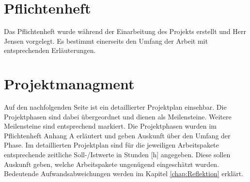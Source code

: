 
\appendix

\chapter{Pflichtenheft}
\label{Pflichtenheft}

Das Pflichtenheft wurde während der Einarbeitung des Projekts erstellt und Herr Jensen vorgelegt. Es bestimmt einerseits den Umfang der Arbeit mit entsprechenden Erläuterungen.




\chapter{Projektmanagment}
\label{Projektmanagment}

Auf den nachfolgenden Seite ist ein detaillierter Projektplan einsehbar. Die Projektphasen sind dabei übergeordnet und dienen als Meilensteine. Weitere Meilensteine sind entsprechend markiert. Die Projektphasen wurden im Pflichtenheft Anhang A erläutert und geben Auskunft über den Umfang der Phase. Im detaillierten Projektplan sind für die jeweiligen Arbeitspakete entsprechende zeitliche Soll-/Istwerte in Stunden [h] angegeben. Diese sollen Auskunft geben, welche Arbeitspakete ungenügend eingeschätzt wurden. Bedeutende Aufwandsabweichungen werden im Kapitel \ref{chap:Reflektion} erklärt.



